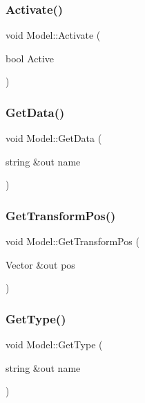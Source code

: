 \subsubsection{\texorpdfstring{Activate()}{Activate()}}
{\footnotesize\ttfamily void Model\+::\+Activate (\begin{DoxyParamCaption}\item[{bool}]{Active }\end{DoxyParamCaption})}

\hypertarget{class_model_a02269e0237ebe399ea4024cb70ebd854}{}\label{class_model_a02269e0237ebe399ea4024cb70ebd854} 
\subsubsection{\texorpdfstring{Get\+Data()}{GetData()}}
{\footnotesize\ttfamily void Model\+::\+Get\+Data (\begin{DoxyParamCaption}\item[{string \&out}]{name }\end{DoxyParamCaption})}

\hypertarget{class_model_a45518389353bf38d40467cd53dbaadeb}{}\label{class_model_a45518389353bf38d40467cd53dbaadeb} 
\subsubsection{\texorpdfstring{Get\+Transform\+Pos()}{GetTransformPos()}}
{\footnotesize\ttfamily void Model\+::\+Get\+Transform\+Pos (\begin{DoxyParamCaption}\item[{Vector \&out}]{pos }\end{DoxyParamCaption})}

\hypertarget{class_model_aafd639768deaf78d9f736913b8604698}{}\label{class_model_aafd639768deaf78d9f736913b8604698} 
\subsubsection{\texorpdfstring{Get\+Type()}{GetType()}}
{\footnotesize\ttfamily void Model\+::\+Get\+Type (\begin{DoxyParamCaption}\item[{string \&out}]{name }\end{DoxyParamCaption})}

